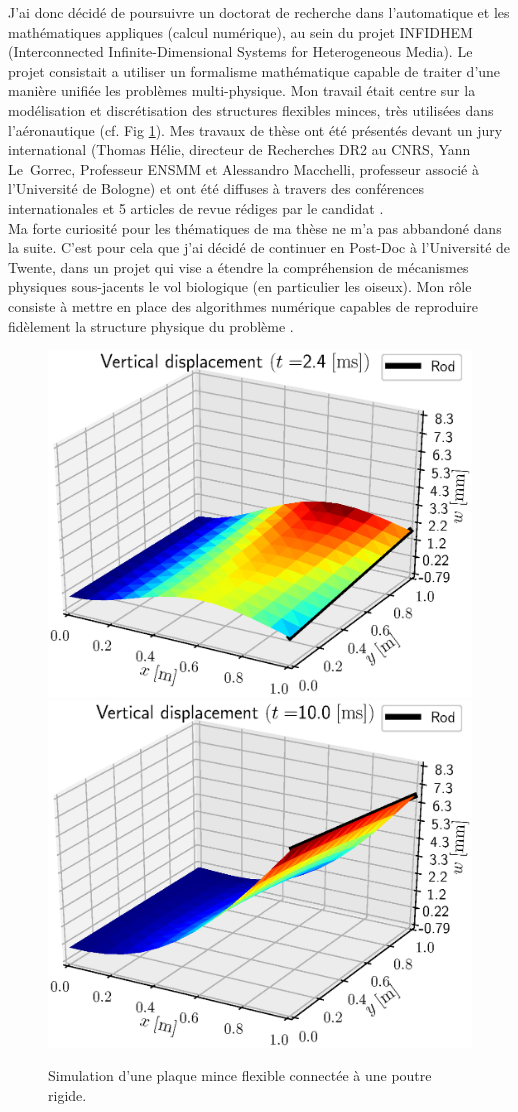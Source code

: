 \documentclass[french]{article}
\begin{document}
J'ai donc décidé de poursuivre un doctorat de recherche dans l'automatique et les mathématiques appliques (calcul numérique), au sein du projet INFIDHEM (Interconnected Infinite-Dimensional Systems for Heterogeneous Media). Le projet consistait a utiliser un formalisme mathématique capable de traiter d'une manière unifiée les problèmes multi-physique. Mon travail était centre sur la modélisation et discrétisation des structures flexibles minces, très utilisées dans l'aéronautique (cf. Fig \ref{fig:IntRod}). Mes travaux de thèse ont été présentés devant un jury international (Thomas Hélie, directeur de Recherches DR2 au CNRS, Yann Le~Gorrec, Professeur ENSMM et Alessandro Macchelli, professeur associé \`a l'Universit\'e de Bologne) et ont été diffuses \`a travers des conférences internationales et 5 articles de revue rédiges par le candidat \cite{brugnoli2019ammmin,brugnoli2019ammkir,brugnoli2020msd,brugnoli2021ther,brugnoli2021num}. \\

Ma forte curiosit\'e pour les thématiques de ma thèse ne m'a pas abbandon\'e dans la suite. C'est pour cela que j'ai décidé de continuer en Post-Doc \`a l'Universit\'e de Twente, dans un projet qui vise a étendre la compréhension de mécanismes physiques sous-jacents le vol biologique (en particulier les oiseux). Mon rôle consiste \`a mettre en place des algorithmes numérique capables de reproduire fidèlement la structure physique du problème \cite{califano2021}.

\begin{figure}[hbt]
	\includegraphics[width=0.5\linewidth]{SnapRod_t25.eps}
	\includegraphics[width=0.5\linewidth]{SnapRod_t100.eps}
	\caption{Simulation d'une plaque mince flexible connectée \`a une poutre rigide.}
	\label{fig:IntRod}
\end{figure}
\end{document}
